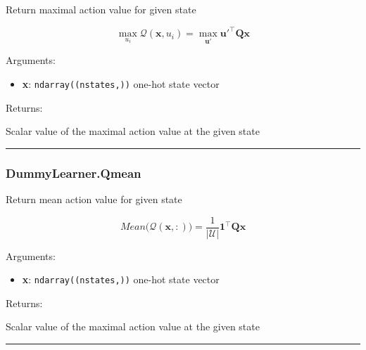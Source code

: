 \begin{Shaded}
\begin{Highlighting}[]
\end{Highlighting}
\end{Shaded}

Return maximal action value for given state

\[
\max_{u_i}\mathcal Q(\mathbf x, u_i) = \max_{\mathbf u'} \mathbf u'^\top \mathbf Q \mathbf x
\]

Arguments:

\begin{itemize}
\tightlist
\item
  \textbf{x}: \texttt{ndarray((nstates,))} one-hot state vector
\end{itemize}

Returns:

Scalar value of the maximal action value at the given state

\begin{center}\rule{0.5\linewidth}{\linethickness}\end{center}

\subsubsection{DummyLearner.Qmean}\label{dummylearner.qmean}

\begin{Shaded}
\begin{Highlighting}[]
\end{Highlighting}
\end{Shaded}

Return mean action value for given state

\[
Mean \big(\mathcal Q(\mathbf x, :)\big) = \frac{1}{|\mathcal U|} \mathbf 1^\top \mathbf Q \mathbf x
\]

Arguments:

\begin{itemize}
\tightlist
\item
  \textbf{x}: \texttt{ndarray((nstates,))} one-hot state vector
\end{itemize}

Returns:

Scalar value of the maximal action value at the given state

\begin{center}\rule{0.5\linewidth}{\linethickness}\end{center}

